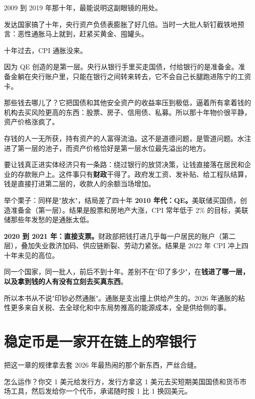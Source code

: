 2009 到 2019 年那十年，最能说明这副眼镜的用处。

发达国家搞了十年，央行资产负债表膨胀了好几倍。当时一大批人斩钉截铁地预言：恶性通胀马上就到，赶紧买黄金、囤罐头。

十年过去，CPI 通胀没来。

因为 QE 创造的是第一层。央行从银行手里买走国债，付给银行的是准备金。准备金躺在央行账户里，只能在银行之间转来转去，它不会自己长腿跑进陈宁的工资卡。

那些钱去哪儿了？它把国债和其他安全资产的收益率压到极低，逼着所有拿着钱的机构去买风险更高的东西：股票、房子、信用债、私募。所以那十年物价很平静，资产价格涨疯了。

存钱的人一无所获，持有资产的人富得流油。这不是道德问题，是管道问题。水注进了第一层的池子，而资产价格恰好是第一层水位最先溢出的地方。

要让钱真正进实体经济只有一条路：绕过银行的放贷决策，让钱直接落在居民和企业的存款账户上。这件事只有\textbf{财政}干得了。政府发工资、发补贴、给工程队结算，钱是直接打进第二层的，收款人的余额当场增加。

\begin{egbox}{举个栗子：同样是"放水"，结局差了四十年}
\textbf{2010 年代：QE。}美联储买国债，创造准备金（第一层）。结果是股票和房地产大涨，CPI 常年低于 2\% 的目标，美联储那些年发愁的是通胀太低。

\textbf{2020 到 2021 年：直接支票。}财政部把钱打进几乎每一户居民的账户（第二层），叠加失业救济加码、供应链断裂、劳动力紧张。结果是 2022 年 CPI 冲上四十年未见的高位。

同一个国家，同一批人，前后不到十年。差别不在"印了多少"，在\textbf{钱进了哪一层，以及拿到钱的人有没有立刻去买真东西}。

所以本书从不说"印钞必然通胀"。通胀是支出撞上供给产生的。2026 年通胀的粘性更多来自关税、去全球化和中东局势推高的能源成本，全是供给侧的事。

\end{egbox}

\section{稳定币是一家开在链上的窄银行}

把这一章的规律拿去套 2026 年最热闹的那个新东西，严丝合缝。

怎么运作？你交 1 美元给发行方，发行方拿这 1 美元去买短期美国国债和货币市场工具，然后发给你一个代币，承诺随时按 1 比 1 换回美元。

